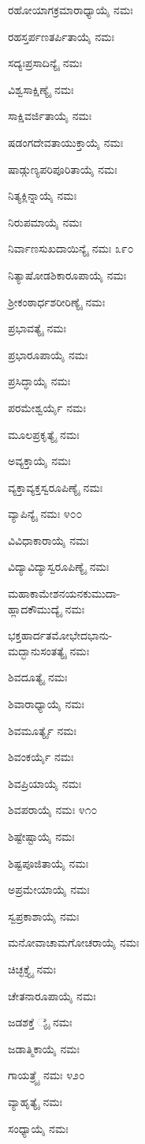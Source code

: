 ರಹೋಯಾಗಕ್ರಮಾರಾಧ್ಯಾಯೈ ನಮಃ

ರಹಸ್ತರ್ಪಣತರ್ಪಿತಾಯೈ ನಮಃ

ಸದ್ಯಃಪ್ರಸಾದಿನ್ಯೈ ನಮಃ

ವಿಶ್ವಸಾಕ್ಷಿಣ್ಯೈ ನಮಃ

ಸಾಕ್ಷಿವರ್ಜಿತಾಯೈ ನಮಃ

ಷಡಂಗದೇವತಾಯುಕ್ತಾಯೈ ನಮಃ

ಷಾಡ್ಗುಣ್ಯಪರಿಪೂರಿತಾಯೈ ನಮಃ

ನಿತ್ಯಕ್ಲಿನ್ನಾಯೈ ನಮಃ

ನಿರುಪಮಾಯೈ ನಮಃ

ನಿರ್ವಾಣಸುಖದಾಯಿನ್ಯೈ ನಮಃ \num{೩೯೦}

ನಿತ್ಯಾಷೋಡಶಿಕಾರೂಪಾಯೈ ನಮಃ

ಶ್ರೀಕಂಠಾರ್ಧಶರೀರಿಣ್ಯೈ ನಮಃ

ಪ್ರಭಾವತ್ಯೈ ನಮಃ

ಪ್ರಭಾರೂಪಾಯೈ ನಮಃ

ಪ್ರಸಿದ್ಧಾಯೈ ನಮಃ

ಪರಮೇಶ್ವರ್ಯೈ ನಮಃ

ಮೂಲಪ್ರಕೃತ್ಯೈ ನಮಃ

ಅವ್ಯಕ್ತಾಯೈ ನಮಃ

ವ್ಯಕ್ತಾವ್ಯಕ್ತಸ್ವರೂಪಿಣ್ಯೈ ನಮಃ

ವ್ಯಾಪಿನ್ಯೈ ನಮಃ \num{೪೦೦}

ವಿವಿಧಾಕಾರಾಯೈ ನಮಃ

ವಿದ್ಯಾವಿದ್ಯಾಸ್ವರೂಪಿಣ್ಯೈ ನಮಃ

ಮಹಾಕಾಮೇಶನಯನಕುಮುದಾ-\\ಹ್ಲಾದಕೌಮುದ್ಯೈ ನಮಃ

ಭಕ್ತಹಾರ್ದತಮೋಭೇದಭಾನು-\\ಮದ್ಭಾನುಸಂತತ್ಯೈ ನಮಃ

ಶಿವದೂತ್ಯೈ ನಮಃ

ಶಿವಾರಾಧ್ಯಾಯೈ ನಮಃ

ಶಿವಮೂರ್ತ್ಯೈ ನಮಃ

ಶಿವಂಕರ್ಯೈ ನಮಃ

ಶಿವಪ್ರಿಯಾಯೈ ನಮಃ

ಶಿವಪರಾಯೈ ನಮಃ \num{೪೧೦}

ಶಿಷ್ಟೇಷ್ಟಾಯೈ ನಮಃ

ಶಿಷ್ಟಪೂಜಿತಾಯೈ ನಮಃ

ಅಪ್ರಮೇಯಾಯೈ ನಮಃ

ಸ್ವಪ್ರಕಾಶಾಯೈ ನಮಃ

ಮನೋವಾಚಾಮಗೋಚರಾಯೈ ನಮಃ

ಚಿಚ್ಛಕ್ತ್ಯೈ ನಮಃ

ಚೇತನಾರೂಪಾಯೈ ನಮಃ

ಜಡಶಕ್ತೆ ್ಯೈ ನಮಃ

ಜಡಾತ್ಮಿಕಾಯೈ ನಮಃ

ಗಾಯತ್ರ್ಯೈ ನಮಃ \num{೪೨೦}

ವ್ಯಾಹೃತ್ಯೈ ನಮಃ

ಸಂಧ್ಯಾಯೈ ನಮಃ

